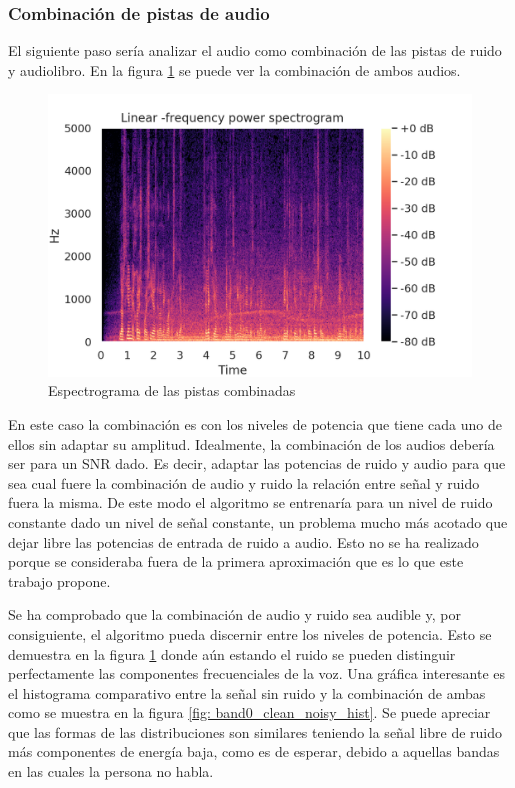 \subsubsection{Combinación de pistas de audio}
El siguiente paso sería analizar el audio como combinación de las pistas de ruido y audiolibro. En la figura \ref{fig: combination_spectral} se puede ver la combinación de ambos audios.

\begin{figure}[h!]
	\centering
	\includegraphics[width=0.9\columnwidth]{figures/combination_spectrogram.png}
	\caption{Espectrograma de las pistas combinadas}
	\label{fig: combination_spectral}
\end{figure}

En este caso la combinación es con los niveles de potencia que tiene cada uno de ellos sin adaptar su amplitud. Idealmente, la combinación de los audios debería ser para un \gls{SNR} dado. Es decir, adaptar las potencias de ruido y audio para que sea cual fuere la combinación de audio y ruido la relación entre señal y ruido fuera la misma. De este modo el algoritmo se entrenaría para un nivel de ruido constante dado un nivel de señal constante, un problema mucho más acotado que dejar libre las potencias de entrada de ruido a audio. Esto no se ha realizado porque se consideraba fuera de la primera aproximación que es lo que este trabajo propone.

Se ha comprobado que la combinación de audio y ruido sea audible y, por consiguiente, el algoritmo pueda discernir entre los niveles de potencia. Esto se demuestra en la figura \ref{fig: combination_spectral} donde aún estando el ruido se pueden distinguir perfectamente las componentes frecuenciales de la voz. Una gráfica interesante es el histograma comparativo entre la señal sin ruido y la combinación de ambas como se muestra en la figura \ref{fig: band0_clean_noisy_hist}. Se puede apreciar que las formas de las distribuciones son similares teniendo la señal libre de ruido más componentes de energía baja, como es de esperar, debido a aquellas bandas en las cuales la persona no habla.


